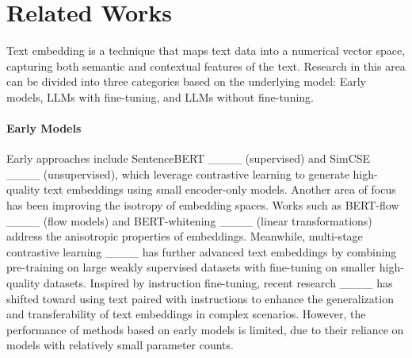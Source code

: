 \section{Related Works}
Text embedding is a technique that maps text data into a numerical vector space, capturing both semantic and contextual features of the text. Research in this area can be divided into three categories based on the underlying model: Early models, LLMs with fine-tuning, and LLMs without fine-tuning.

\paragraph{Early Models} Early approaches
include SentenceBERT ____ (supervised) and SimCSE ____ (unsupervised), which leverage contrastive learning to generate high-quality text embeddings using small encoder-only models. Another area of focus has been improving the isotropy of embedding spaces. Works such as BERT-flow ____ (flow models) and BERT-whitening ____ (linear transformations) address the anisotropic properties of embeddings. Meanwhile, multi-stage contrastive learning ____ has further advanced text embeddings by combining pre-training on large weakly supervised datasets with fine-tuning on smaller high-quality datasets. Inspired by instruction fine-tuning, recent research ____ has shifted toward using text paired with instructions to enhance the generalization and transferability of text embeddings in complex scenarios. However, the performance of methods based on early models is limited, due to their reliance on models with relatively small parameter counts.


